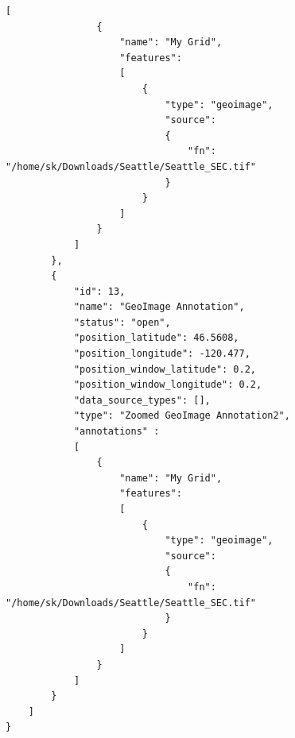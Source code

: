 \begin{lstlisting}[basicstyle=\small\ttfamily]
            [
                {
                    "name": "My Grid",
                    "features":
                    [
                        {
                            "type": "geoimage",
                            "source": 
                            {
                                "fn": "/home/sk/Downloads/Seattle/Seattle_SEC.tif"
                            }
                        }
                    ]
                }
            ]
        },
        {
            "id": 13,
            "name": "GeoImage Annotation",
            "status": "open",
            "position_latitude": 46.5608,
            "position_longitude": -120.477,
            "position_window_latitude": 0.2,
            "position_window_longitude": 0.2,
            "data_source_types": [],
            "type": "Zoomed GeoImage Annotation2",
            "annotations" :
            [
                {
                    "name": "My Grid",
                    "features":
                    [
                        {
                            "type": "geoimage",
                            "source": 
                            {
                                "fn": "/home/sk/Downloads/Seattle/Seattle_SEC.tif"
                            }
                        }
                    ]
                }
            ]
        }
    ]
}

\end{lstlisting}

